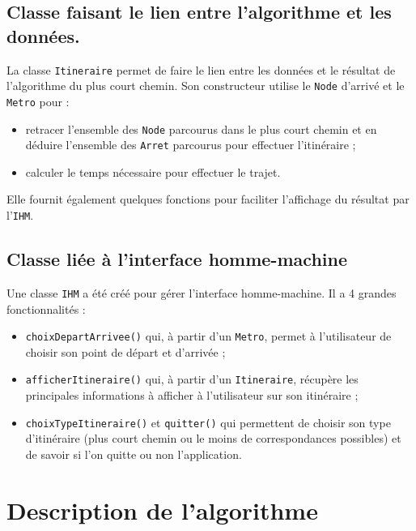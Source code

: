 \documentclass[,french]{article}
\begin{document}
\hypertarget{classe-faisant-le-lien-entre-lalgorithme-et-les-donnuxe9es.}{%
\subsection{Classe faisant le lien entre l'algorithme et les
données.}\label{classe-faisant-le-lien-entre-lalgorithme-et-les-donnuxe9es.}}

La classe \texttt{Itineraire} permet de faire le lien entre les données
et le résultat de l'algorithme du plus court chemin. Son constructeur
utilise le \texttt{Node} d'arrivé et le \texttt{Metro} pour :

\begin{itemize}
\item
  retracer l'ensemble des \texttt{Node} parcourus dans le plus court
  chemin et en déduire l'ensemble des \texttt{Arret} parcourus pour
  effectuer l'itinéraire ;
\item
  calculer le temps nécessaire pour effectuer le trajet.
\end{itemize}

Elle fournit également quelques fonctions pour faciliter l'affichage du
résultat par l'\texttt{IHM}.

\hypertarget{classe-liuxe9e-uxe0-linterface-homme-machine}{%
\subsection{Classe liée à l'interface
homme-machine}\label{classe-liuxe9e-uxe0-linterface-homme-machine}}

Une classe \texttt{IHM} a été créé pour gérer l'interface homme-machine.
Il a 4 grandes fonctionnalités :

\begin{itemize}
\item
  \texttt{choixDepartArrivee()} qui, à partir d'un \texttt{Metro},
  permet à l'utilisateur de choisir son point de départ et d'arrivée ;
\item
  \texttt{afficherItineraire()} qui, à partir d'un \texttt{Itineraire},
  récupère les principales informations à afficher à l'utilisateur sur
  son itinéraire ;
\item
  \texttt{choixTypeItineraire()} et \texttt{quitter()} qui permettent de
  choisir son type d'itinéraire (plus court chemin ou le moins de
  correspondances possibles) et de savoir si l'on quitte ou non
  l'application.
\end{itemize}

\hypertarget{sec:algo}{%
\section{Description de l'algorithme}\label{sec:algo}}
\end{document}
